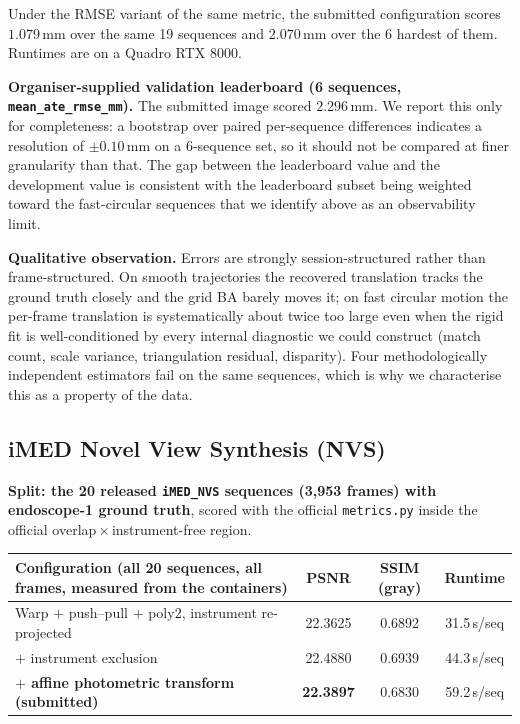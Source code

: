 Under the RMSE variant of the same metric, the submitted configuration scores $1.079$\,mm over the same
19 sequences and $2.070$\,mm over the 6 hardest of them. Runtimes are on a Quadro RTX 8000.

\textbf{Organiser-supplied validation leaderboard (6 sequences, \texttt{mean\_ate\_rmse\_mm}).} The
submitted image scored $2.296$\,mm. We report this only for completeness: a bootstrap over paired
per-sequence differences indicates a resolution of $\pm 0.10$\,mm on a 6-sequence set, so it should not be
compared at finer granularity than that. The gap between the leaderboard value and the development value
is consistent with the leaderboard subset being weighted toward the fast-circular sequences that we
identify above as an observability limit.

\textbf{Qualitative observation.} Errors are strongly session-structured rather than frame-structured.
On smooth trajectories the recovered translation tracks the ground truth closely and the grid BA barely
moves it; on fast circular motion the per-frame translation is systematically about twice too large even
when the rigid fit is well-conditioned by every internal diagnostic we could construct
(match count, scale variance, triangulation residual, disparity). Four methodologically independent
estimators fail on the same sequences, which is why we characterise this as a property of the data.

\subsection{iMED Novel View Synthesis (NVS)}

\textbf{Split: the 20 released \texttt{iMED\_NVS} sequences (3{,}953 frames) with endoscope-1 ground
truth}, scored with the official \texttt{metrics.py} inside the official
overlap\,$\times$\,instrument-free region.

\begin{center}
\begin{tabular}{lccc}
\toprule
Configuration (all 20 sequences, all frames, measured from the containers) & PSNR & SSIM (gray) & Runtime \\
\midrule
Warp $+$ push--pull $+$ poly2, instrument re-projected     & 22.3625 & 0.6892 & 31.5\,s/seq \\
\quad $+$ instrument exclusion                              & 22.4880 & 0.6939 & 44.3\,s/seq \\
\textbf{$+$ affine photometric transform (submitted)}       & \textbf{22.3897} & 0.6830 & 59.2\,s/seq \\
\bottomrule
\end{tabular}
\end{center}

